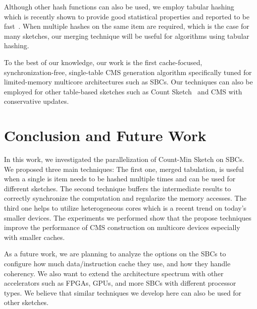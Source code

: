 \documentclass[runningheads]{llncs}
\begin{document}
Although other hash functions can also be used, we employ tabular hashing which is recently shown to provide good statistical properties and reported to be fast~\cite{thorup2017,Dahlgaard2017}. When multiple hashes on the same item are required, which is the case for many sketches, our merging technique will be useful for algorithms using tabular hashing. 

To the best of our knowledge, our work is the first cache-focused, synchronization-free, single-table CMS generation algorithm specifically tuned for limited-memory multicore architectures such as SBCs. Our techniques can also be employed for other table-based sketches such as Count Sketch~\cite{charikar2002} and CMS with conservative updates.

\section{Conclusion and Future Work}\label{sec:con}

In this work, we investigated the parallelization of Count-Min Sketch on SBCs. We proposed three main techniques: The first one, merged tabulation, is useful when a single is item needs to be hashed multiple times and can be used for different sketches. The second technique buffers the intermediate results to correctly synchronize the computation and regularize the memory accesses. The third one helps to utilize heterogeneous cores which is a recent trend on today's smaller devices. The experiments we performed show that the propose techniques improve the performance of CMS construction on multicore devices especially with smaller caches.

As a future work, we are planning to analyze the options on the SBCs to configure how much data/instruction cache they use, and how they handle coherency. We also want to extend the architecture spectrum with other accelerators such as FPGAs, GPUs, and more SBCs with different processor types. We believe that similar techniques we develop here can also be used for other sketches. 

 \renewcommand{\baselinestretch}{0.97}
 
 
  \renewcommand{\baselinestretch}{1}
\end{document}
